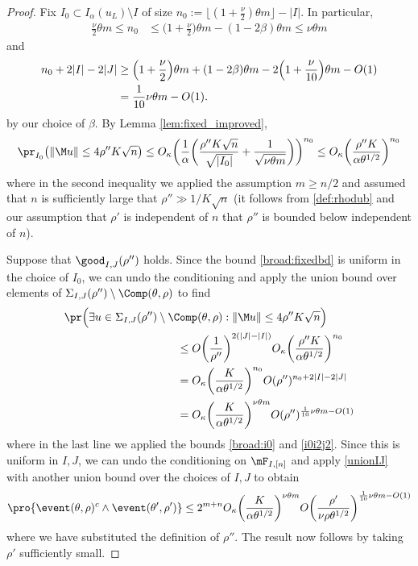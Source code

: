 \documentclass[aop,preprint]{imsart}
\theoremstyle{plain}
\theoremstyle{definition}
\theoremstyle{remark}
\numberwithin{equation}{section}
\numberwithin{theorem}{section}
\def \lf {\lfloor}
\def \rf {\rfloor}
\begin{document}
\begin{proof}
Fix $I_0\subset I_\alpha(u_L)\setminus I$ of size $n_0:=\lf (1+\frac\nu2)\theta m\rf -|I|$.
In particular,
\begin{align}	
\frac{\nu}{2}\theta m\le n_0 &\le \Big(1+\frac\nu2\Big)\theta m -(1-2\beta)\theta m \le \nu\theta m		\label{broad:i0}
\end{align}
and
\begin{align}
n_0+2|I|-2|J| &\ge \Big(1+\frac\nu2\Big)\theta m + (1-2\beta)\theta m- 2\Big(1+\frac{\nu}{10}\Big)\theta m -O(1) \notag\\
&=\frac1{10}\nu\theta m-O(1).	\label{i0i2j2}
\end{align}
by our choice of $\beta$.
By Lemma \ref{lem:fixed_improved},
\begin{equation}	\label{broad:fixedbd}
\pr_{I_0}\big( \|\M u\| \le 4\rho''K\sqrt{n}\big) \le O_\kappa\bigg(\frac1\alpha\bigg( \frac{\rho''K\sqrt{n}}{\sqrt{|I_0|}} + \frac{1}{\sqrt{\nu\theta m}}\bigg)\bigg)^{n_0}\le O_\kappa\bigg(\frac{\rho''K}{\alpha\theta^{1/2}}\bigg)^{n_0}
\end{equation}
where in the second inequality we applied the assumption $m\ge n/2$ and assumed that $n$ is sufficiently large that $\rho''\gg 1/K\sqrt{n}$ (it follows from \eqref{def:rhodub} and our assumption that $\rho'$ is independent of $n$ that $\rho''$ is bounded below independent of $n$).

Suppose that $\good_{I,J}(\rho'')$ holds.
Since the bound \eqref{broad:fixedbd} is uniform in the choice of $I_0$, we can undo the conditioning and apply the union bound over elements of $\Sigma_{I,J}(\rho'')\setminus \Comp(\theta,\rho)$ to find
\begin{align*}
&\pr\Big( \exists u\in \Sigma_{I,J}(\rho'')\setminus \Comp(\theta,\rho): \|\M u\|\le 4\rho''K\sqrt{n}\Big) \\
&\qquad\qquad\qquad\qquad\qquad\le O\bigg(\frac{1}{\rho''}\bigg)^{2(|J|-|I|)} O_\kappa\bigg(\frac{\rho''K}{\alpha\theta^{1/2}}\bigg)^{n_0}\\
&\qquad\qquad\qquad\qquad\qquad=O_\kappa\bigg(\frac{K}{\alpha\theta^{1/2}}\bigg)^{n_0}O(\rho'')^{n_0+2|I|-2|J|}\\
&\qquad\qquad\qquad\qquad\qquad=O_\kappa\bigg(\frac{K}{\alpha\theta^{1/2}}\bigg)^{\nu \theta m}O(\rho'')^{\frac1{10}\nu\theta m - O(1)}
\end{align*}
where in the last line we applied the bounds \eqref{broad:i0} and \eqref{i0i2j2}.
Since this is uniform in $I,J$, we can undo the conditioning on $\mF_{I,[n]}$ and apply \eqref{unionIJ} with another union bound over the choices of $I,J$ to obtain
\begin{equation}	\label{incr:pen}
\pro{\event(\theta,\rho)^c\wedge\event(\theta',\rho')} 
 \le 2^{m+n} O_\kappa\bigg(\frac{K}{\alpha\theta^{1/2}}\bigg)^{\nu \theta m}O\bigg(\frac{\rho'}{\nu\rho\theta^{1/2}}\bigg)^{\frac1{10}\nu\theta m - O(1)}
\end{equation}
where we have substituted the definition of $\rho''$.
The result now follows by taking $\rho'$ sufficiently small.
\end{proof}
\end{document}
